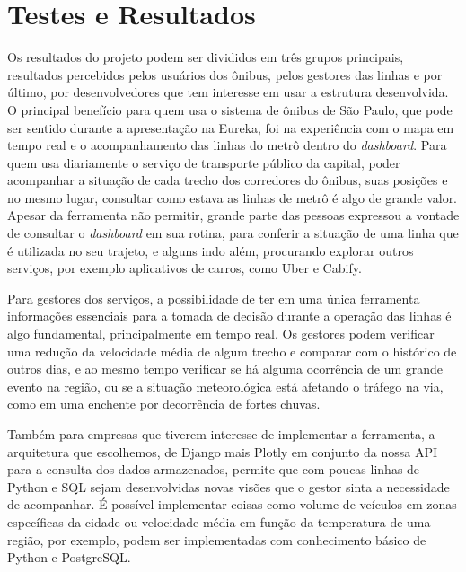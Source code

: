 \chapter{Testes e Resultados}
\label{Cap:Resultados}
\newcommand{\EscalaAlgumaCoisa}{0.6}
\indent
\par Os resultados do projeto podem ser divididos em três grupos principais, resultados percebidos pelos usuários dos ônibus, pelos gestores das linhas e por último, por desenvolvedores que tem interesse em usar a estrutura desenvolvida. O principal benefício para quem usa o sistema de ônibus de São Paulo, que pode ser sentido durante a apresentação na Eureka, foi na experiência com o mapa em tempo real e o acompanhamento das linhas do metrô dentro do \textit{dashboard}. Para quem usa diariamente o serviço de transporte público da capital, poder acompanhar a situação de cada trecho dos corredores do ônibus, suas posições e no mesmo lugar, consultar como estava as linhas de metrô é algo de grande valor. Apesar da ferramenta não permitir, grande parte das pessoas expressou a vontade de consultar o \textit{dashboard} em sua rotina, para conferir a situação de uma linha que é utilizada no seu trajeto, e alguns indo além, procurando explorar outros serviços, por exemplo aplicativos de carros, como Uber e Cabify.
\indent
\par Para gestores dos serviços, a possibilidade de ter em uma única ferramenta informações essenciais para a tomada de decisão durante a operação das linhas é algo fundamental, principalmente em tempo real. Os gestores podem verificar uma redução da velocidade média de algum trecho e comparar com o histórico de outros dias, e ao mesmo tempo verificar se há alguma ocorrência de um grande evento na região, ou se a situação meteorológica está afetando o tráfego na via, como em uma enchente por decorrência de fortes chuvas.
\indent
\par Também para empresas que tiverem interesse de implementar a ferramenta, a arquitetura que escolhemos, de Django mais Plotly em conjunto da nossa API para a consulta dos dados armazenados, permite que com poucas linhas de Python e SQL sejam desenvolvidas novas visões que o gestor sinta a necessidade de acompanhar. É possível implementar coisas como volume de veículos em zonas específicas da cidade ou velocidade média em função da temperatura de uma região, por exemplo, podem ser implementadas com conhecimento básico de Python e PostgreSQL.
\indent
